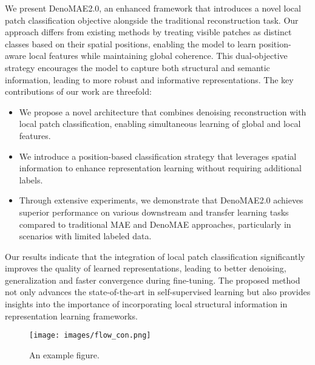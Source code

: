 We present DenoMAE2.0, an enhanced framework that introduces a novel local patch classification objective alongside the traditional reconstruction task. Our approach differs from existing methods by treating visible patches as distinct classes based on their spatial positions, enabling the model to learn position-aware local features while maintaining global coherence. This dual-objective strategy encourages the model to capture both structural and semantic information, leading to more robust and informative representations.
The key contributions of our work are threefold:

\begin{itemize}
    \item We propose a novel architecture that combines denoising reconstruction with local patch classification, enabling simultaneous learning of global and local features.
    \item We introduce a position-based classification strategy that leverages spatial information to enhance representation learning without requiring additional labels.
    \item Through extensive experiments, we demonstrate that DenoMAE2.0 achieves superior performance on various downstream and transfer learning tasks compared to traditional MAE and DenoMAE approaches, particularly in scenarios with limited labeled data.
\end{itemize}

Our results indicate that the integration of local patch classification significantly improves the quality of learned representations, leading to better denoising, generalization and faster convergence during fine-tuning. The proposed method not only advances the state-of-the-art in self-supervised learning but also provides insights into the importance of incorporating local structural information in representation learning frameworks.

\begin{figure*}[htbp]
    \centering
    \texttt{[image: images/flow\_con.png]}
    \caption{An example figure.}
    \label{fig:denomae2}
\end{figure*}